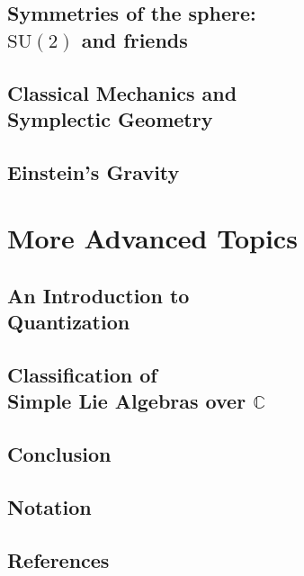 \documentclass[12pt, twoside, openany]{book}
\newcommand{\1}{\mathbbm{1}}
\theoremstyle{definition}
\begin{document}
\chapter[Symmetries of the sphere: $\mathrm{SU}(2)$ and friends]{Symmetries of the sphere: \\$\mathrm{SU}(2)$ and friends}

\chapter[Classical Mechanics and Symplectic Geometry]{Classical Mechanics and\\ Symplectic Geometry}\label{ch:Symplectic}

\chapter{Einstein's Gravity}\label{ch:GR}

\part{More Advanced Topics}\thispagestyle{empty}

\chapter[An Introduction to Quantization]{An Introduction to \\Quantization}

\chapter[Classification of Simple Lie Algebras over $\mathbb C$]{Classification of\\ Simple Lie Algebras over $\mathbb{C}$}

\chapter*{Conclusion}\thispagestyle{empty}



 

\chapter*{Notation}\thispagestyle{empty}

\chapter*{References}\thispagestyle{empty}


\printindex
\end{document}
